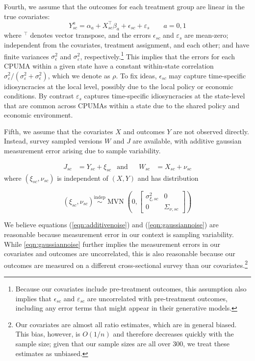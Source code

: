 \documentclass[aoas]{imsart}
\theoremstyle{plain}
\theoremstyle{remark}
\begin{document}
Fourth, we assume that the outcomes for each treatment group are linear in the true covariates:
\begin{equation}\label{eqn:linmod}
Y_{sc}^a = \alpha_a + X_{sc}^\top\beta_a + \epsilon_{sc} + \varepsilon_s \qquad a = 0, 1
\end{equation}
%
where $^\top$ denotes vector transpose, and the errors $\epsilon_{sc}$ and $\varepsilon_{s}$ are mean-zero; independent from the covariates, treatment assignment, and each other; and have finite variances $\sigma^2_{\epsilon}$ and $\sigma^2_{\varepsilon}$, respectively.\footnote{Because our covariates include pre-treatment outcomes, this assumption also implies that $\epsilon_{sc}$ and $\varepsilon_{sc}$ are uncorrelated with pre-treatment outcomes, including any error terms that might appear in their generative models.} This implies that the errors for each CPUMA within a given state have a constant within-state correlation $\sigma^2_{\varepsilon}/(\sigma^2_{\varepsilon} + \sigma^2_{\epsilon})$, which we denote as $\rho$. To fix ideas, $\epsilon_{sc}$ may capture time-specific idiosyncracies at the local level, possibly due to the local policy or economic conditions. By contrast $\varepsilon_s$ captures time-specific idiosyncracies at the state-level that are common across CPUMAs within a state due to the shared policy and economic environment.

Fifth, we assume that the covariates $X$ and outcomes $Y$ are not observed directly. Instead, survey sampled versions $W$ and $J$ are available, with additive gaussian measurement error arising due to sample variability.

\begin{align} \label{eqn:additivenoise}
	J_{sc} & = Y_{sc} + \xi_{sc} & \text{and} & & W_{sc} & = X_{sc} + \nu_{sc}
\end{align}
where $(\xi_{sc}, \nu_{sc})$ is independent of $(X, Y)$ and has distribution

\begin{equation} \label{eqn:gaussiannoise}
 (\xi_{sc}, \nu_{sc}) \stackrel{\text{indep}}{\sim} \operatorname{MVN}\left(0, \left[\begin{array}{cc} \sigma_{\xi,sc}^2 & 0 \\ 0 & \Sigma_{\nu, sc} \end{array}\right] \right)
\end{equation}

We believe equations (\ref{eqn:additivenoise}) and (\ref{eqn:gaussiannoise}) are reasonable because measurement error in our context is sampling variability. While \eqref{eqn:gaussiannoise} further implies the measurement errors in our covariates and outcomes are uncorrelated, this is also reasonable because our outcomes are measured on a different cross-sectional survey than our covariates.\footnote{Our covariates are almost all ratio estimates, which are in general biased. This bias, however, is $O(1/n)$ and therefore decreases quickly with the sample size; given that our sample sizes are all over 300, we treat these estimates as unbiased.} 
\end{document}
